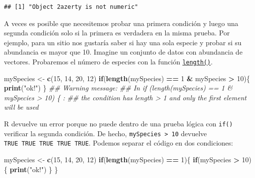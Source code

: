 \documentclass[
]{book}
\newenvironment{Shaded}{\begin{snugshade}}{\end{snugshade}}
\newcommand{\CommentTok}[1]{\textcolor[rgb]{0.56,0.35,0.01}{\textit{#1}}}
\newcommand{\ControlFlowTok}[1]{\textcolor[rgb]{0.13,0.29,0.53}{\textbf{#1}}}
\newcommand{\DecValTok}[1]{\textcolor[rgb]{0.00,0.00,0.81}{#1}}
\newcommand{\KeywordTok}[1]{\textcolor[rgb]{0.13,0.29,0.53}{\textbf{#1}}}
\newcommand{\NormalTok}[1]{#1}
\newcommand{\OperatorTok}[1]{\textcolor[rgb]{0.81,0.36,0.00}{\textbf{#1}}}
\newcommand{\StringTok}[1]{\textcolor[rgb]{0.31,0.60,0.02}{#1}}
\begin{document}
\begin{verbatim}
## [1] "Object 2azerty is not numeric"
\end{verbatim}

A veces es posible que necesitemos probar una primera condición y luego una segunda condición solo si la primera es verdadera en la misma prueba. Por ejemplo, para un sitio nos gustaría saber si hay una sola especie y probar si su abundancia es mayor que 10. Imagine un conjunto de datos con abundancia de vectores. Probaremos el número de especies con la función \protect\hyperlink{l015length}{\texttt{length()}}.

\begin{Shaded}
\begin{Highlighting}[]
\NormalTok{mySpecies <-}\StringTok{ }\KeywordTok{c}\NormalTok{(}\DecValTok{15}\NormalTok{, }\DecValTok{14}\NormalTok{, }\DecValTok{20}\NormalTok{, }\DecValTok{12}\NormalTok{)}
\ControlFlowTok{if}\NormalTok{(}\KeywordTok{length}\NormalTok{(mySpecies) }\OperatorTok{==}\StringTok{ }\DecValTok{1} \OperatorTok{&}\StringTok{ }\NormalTok{mySpecies }\OperatorTok{>}\StringTok{ }\DecValTok{10}\NormalTok{)\{}
  \KeywordTok{print}\NormalTok{(}\StringTok{"ok!"}\NormalTok{)}
\NormalTok{\}}
\CommentTok{## Warning message:}
\CommentTok{## In if (length(mySpecies) == 1 & mySpecies > 10) \{ :}
\CommentTok{##   the condition has length > 1 and only the first element will be used}
\end{Highlighting}
\end{Shaded}

R devuelve un error porque no puede dentro de una prueba lógica con \texttt{if()} verificar la segunda condición. De hecho, \texttt{mySpecies\ \textgreater{}\ 10} devuelve \texttt{TRUE\ TRUE\ TRUE\ TRUE\ TRUE}. Podemos separar el código en dos condiciones:

\begin{Shaded}
\begin{Highlighting}[]
\NormalTok{mySpecies <-}\StringTok{ }\KeywordTok{c}\NormalTok{(}\DecValTok{15}\NormalTok{, }\DecValTok{14}\NormalTok{, }\DecValTok{20}\NormalTok{, }\DecValTok{12}\NormalTok{)}
\ControlFlowTok{if}\NormalTok{(}\KeywordTok{length}\NormalTok{(mySpecies) }\OperatorTok{==}\StringTok{ }\DecValTok{1}\NormalTok{)\{}
  \ControlFlowTok{if}\NormalTok{(mySpecies }\OperatorTok{>}\StringTok{ }\DecValTok{10}\NormalTok{)\{}
    \KeywordTok{print}\NormalTok{(}\StringTok{"ok!"}\NormalTok{)}
\NormalTok{  \}}
\NormalTok{\}}
\end{Highlighting}
\end{Shaded}
\end{document}
